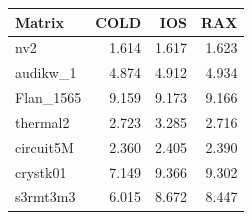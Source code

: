 \begin{table}[htbp]
  \centering
  \label{tab:methodology_arm}
  \begin{tabular}{lrrr}
    \toprule
    \textbf{Matrix} & \textbf{COLD} & \textbf{IOS} & \textbf{RAX} \\
    \midrule
    nv2 & 1.614 & 1.617 & 1.623 \\
    audikw\_1 & 4.874 & 4.912 & 4.934 \\
    Flan\_1565 & 9.159 & 9.173 & 9.166 \\
    thermal2 & 2.723 & 3.285 & 2.716 \\
    circuit5M & 2.360 & 2.405 & 2.390 \\
    crystk01 & 7.149 & 9.366 & 9.302 \\
    s3rmt3m3 & 6.015 & 8.672 & 8.447 \\
    \bottomrule
  \end{tabular}
\end{table}